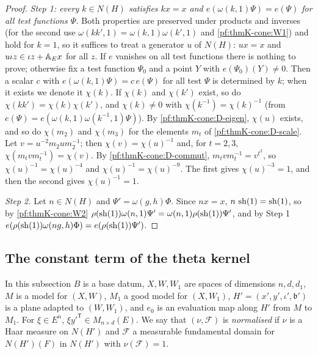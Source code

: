 \begin{proof}
\emph{Step 1: every $k\in N(H)$ satisfies $kx=x$ and $e(\omega(k,1)\Psi)=e(\Psi)$ for all test functions $\Psi$.}  Both
properties are preserved under products and inverses (for the second use $\omega(kk',1)=\omega(k,1)\omega(k',1)$ and
\ref{pf:thmK-cone:W1}) and hold for $k=1$, so it suffices to treat a generator $u$ of $N(H)$: $ux=x$ and
$u\iota z\in\iota z+\mathbb{A}_E x$ for all $z$.  If $e$ vanishes on all test functions there is nothing to prove;
otherwise fix a test function $\Psi_0$ and a point $Y$ with $e(\Psi_0)(Y)\neq0$.  Then a scalar $c$ with
$e(\omega(k,1)\Psi)=c\,e(\Psi)$ for all test $\Psi$ is determined by $k$; when it exists we denote it $\chi(k)$.  If
$\chi(k)$ and $\chi(k')$ exist, so do $\chi(kk')=\chi(k)\chi(k')$, and $\chi(k)\neq0$ with $\chi(k^{-1})=\chi(k)^{-1}$
(from $e(\Psi)=e(\omega(k,1)\omega(k^{-1},1)\Psi)$).  By \ref{pf:thmK-cone:D-eigen}, $\chi(u)$ exists, and so do
$\chi(m_2)$ and $\chi(m_3)$ for the elements $m_t$ of \ref{pf:thmK-cone:D-scale}.  Let $v=u^{-2}m_2um_2^{-1}$; then
$\chi(v)=\chi(u)^{-1}$ and, for $t=2,3$, $\chi(m_tvm_t^{-1})=\chi(v)$.  By \ref{pf:thmK-cone:D-commut},
$m_tvm_t^{-1}=v^{t^2}$, so $\chi(u)^{-1}=\chi(u)^{-4}$ and $\chi(u)^{-1}=\chi(u)^{-9}$.  The first gives
$\chi(u)^{-3}=1$, and then the second gives $\chi(u)^{-1}=1$.

\emph{Step 2.}  Let $n\in N(H)$ and $\Psi'=\omega(g,h)\Phi$.  Since $nx=x$, $n\,\operatorname{sh}(1)=\operatorname{sh}(1)$,
so by \ref{pf:thmK-cone:W2} $\rho(\operatorname{sh}(1))\omega(n,1)\Psi'=\omega(n,1)\rho(\operatorname{sh}(1))\Psi'$, and by
Step 1 $e(\rho(\operatorname{sh}(1))\omega(ng,h)\Phi)=e(\rho(\operatorname{sh}(1))\Psi')$.
\end{proof}

\subsection{The constant term of the theta kernel}\label{pf:thmK-cone:ctkernel}

In this subsection $B$ is a base datum, $X,W,W_1$ are spaces of dimensions $n,d,d_1$, $M$ is a model for $(X,W)$,
$M_1$ a good model for $(X,W_1)$, $H'=(x',y',\iota',\mathfrak b')$ is a plane adapted to $(W,W_1)$, and $e_0$ is an
evaluation map along $H'$ from $M$ to $M_1$.  For $\xi\in E^n$, $\xi y'^{\mathsf T}\in M_{n\times d}(E)$.  We say that
$(\nu,\mathcal F)$ is \emph{normalised} if $\nu$ is a Haar measure on $N(H')$ and $\mathcal F$ a measurable fundamental
domain for $N(H')(F)$ in $N(H')$ with $\nu(\mathcal F)=1$.

